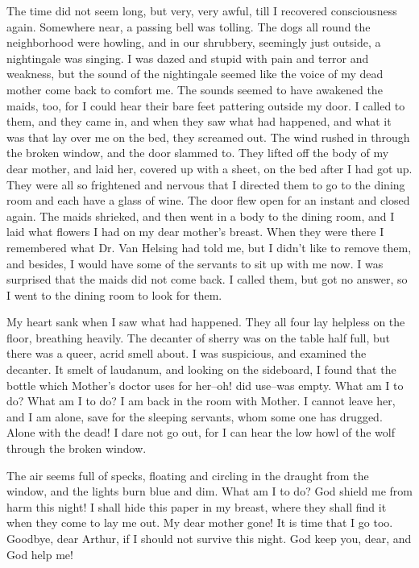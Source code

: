 The time did not seem long, but very, very awful, till I recovered consciousness again. Somewhere near, a passing bell was tolling. The dogs all round the neighborhood were howling, and in our shrubbery, seemingly just outside, a nightingale was singing. I was dazed and stupid with pain and terror and weakness, but the sound of the nightingale seemed like the voice of my dead mother come back to comfort me. The sounds seemed to have awakened the maids, too, for I could hear their bare feet pattering outside my door. I called to them, and they came in, and when they saw what had happened, and what it was that lay over me on the bed, they screamed out. The wind rushed in through the broken window, and the door slammed to. They lifted off the body of my dear mother, and laid her, covered up with a sheet, on the bed after I had got up. They were all so frightened and nervous that I directed them to go to the dining room and each have a glass of wine. The door flew open for an instant and closed again. The maids shrieked, and then went in a body to the dining room, and I laid what flowers I had on my dear mother's breast. When they were there I remembered what Dr. Van Helsing had told me, but I didn't like to remove them, and besides, I would have some of the servants to sit up with me now. I was surprised that the maids did not come back. I called them, but got no answer, so I went to the dining room to look for them. 

My heart sank when I saw what had happened. They all four lay helpless on the floor, breathing heavily. The decanter of sherry was on the table half full, but there was a queer, acrid smell about. I was suspicious, and examined the decanter. It smelt of laudanum, and looking on the sideboard, I found that the bottle which Mother's doctor uses for her--oh! did use--was empty. What am I to do? What am I to do? I am back in the room with Mother. I cannot leave her, and I am alone, save for the sleeping servants, whom some one has drugged. Alone with the dead! I dare not go out, for I can hear the low howl of the wolf through the broken window. 

The air seems full of specks, floating and circling in the draught from the window, and the lights burn blue and dim. What am I to do? God shield me from harm this night! I shall hide this paper in my breast, where they shall find it when they come to lay me out. My dear mother gone! It is time that I go too. Goodbye, dear Arthur, if I should not survive this night. God keep you, dear, and God help me! 

